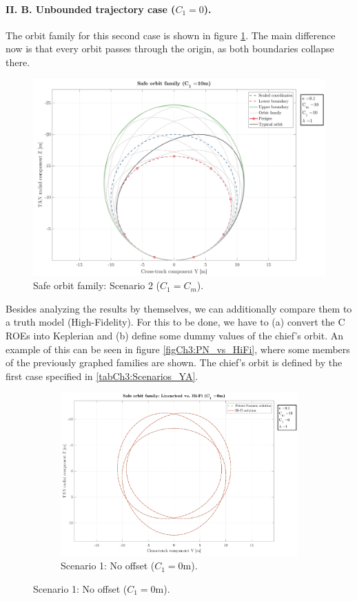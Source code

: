 		\paragraph{\textcolor{GMVred}{II. B.} Unbounded trajectory case ($C_1 = 0$). \\}		
		\indent The orbit family for this second case is shown in figure \ref{figCh3:Safe_orbit_2}. The main difference now is that every orbit passes through the origin, as both boundaries collapse there.
		\begin{figure}[!htb]
		\centering\includegraphics[width = 0.7\linewidth]{Chapters/Chapter_03/Safe_orbit_C1_10}
		\caption{Safe orbit family: Scenario 2 ($C_1 = C_m$).}
		\label{figCh3:Safe_orbit_2}
		\end{figure}
		\FloatBarrier
		\indent Besides analyzing the results by themselves, we can additionally compare them to a truth model (High-Fidelity). For this to be done, we have to (a) convert the C ROEs into Keplerian and (b) define some dummy values of the chief's orbit. An example of this can be seen in figure \ref{figCh3:PN_vs_HiFi}, where some members of the previously graphed families are shown. The chief's orbit is defined by the first case specified in \ref{tabCh3:Scenarios_YA}.
		\begin{figure}[ht]
		\centering
		\medskip
		\begin{subfigure}[t]{.7\linewidth}
		\centering\includegraphics[width=\linewidth]{Chapters/Chapter_03/Safe_orbit_comp_C1_0}
		\caption{Scenario 1: No offset ($C_1 = 0$m).}
		\label{figCh3:PN_vs_HiFi_1}
		\end{subfigure}
		\end{figure}
